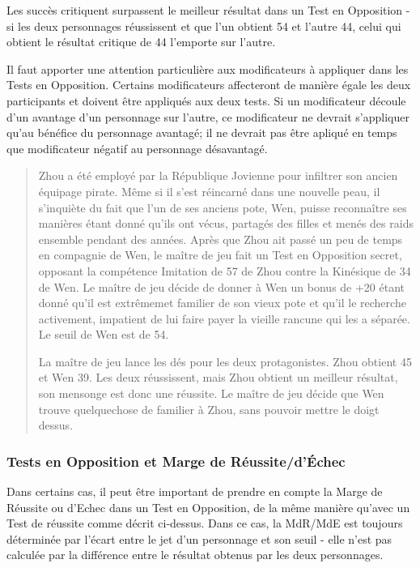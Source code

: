 Les succès critiquent surpassent le meilleur résultat dans un Test en Opposition - si les deux personnages réussissent et que l'un obtient 54 et l'autre 44, celui qui obtient le résultat critique de 44 l'emporte sur l'autre. 

Il faut apporter une attention particulière aux modificateurs à appliquer dans les Tests en Opposition. Certains modificateurs affecteront de manière égale les deux participants et doivent être appliqués aux deux tests. Si un modificateur découle d'un avantage d'un personnage sur l'autre, ce modificateur ne devrait s'appliquer qu'au bénéfice du personnage avantagé; il ne devrait pas être apliqué en temps que modificateur négatif au personnage désavantagé. 

\begin{quotation} Zhou a été employé par la République Jovienne pour infiltrer son ancien équipage pirate. Même si il s'est réincarné dans une nouvelle peau, il s'inquiète du fait que l'un de ses anciens pote, Wen, puisse reconnaître ses manières étant donné qu'ils ont vécus, partagés des filles et menés des raids ensemble pendant des années. Après que Zhou ait passé un peu de temps en compagnie de Wen, le maître de jeu fait un Test en Opposition secret, opposant la compétence Imitation de 57 de Zhou contre la Kinésique de 34 de Wen. Le maître de jeu décide de donner à Wen un bonus de +20 étant donné qu'il est extrêmemet familier de son vieux pote et qu'il le recherche activement, impatient de lui faire payer la vieille rancune qui les a séparée. Le seuil de Wen est de 54. 

La maître de jeu lance les dés pour les deux protagonistes. Zhou obtient 45 et Wen 39. Les deux réussissent, mais Zhou obtient un meilleur résultat, son mensonge est donc une réussite. Le maître de jeu décide que Wen trouve quelquechose de familier à Zhou, sans pouvoir mettre le doigt dessus. \end{quotation} 

\subsubsection{Tests en Opposition et Marge de Réussite/d'Échec} \label{sec:opposed-tests-margin} 

Dans certains cas, il peut être important de prendre en compte la Marge de Réussite ou d'Echec dans un Test en Opposition, de la même manière qu'avec un Test de réussite comme décrit ci-dessus. Dans ce cas, la MdR/MdE est toujours déterminée par l'écart entre le jet d'un personnage et son seuil - elle n'est pas calculée par la différence entre le résultat obtenus par les deux personnages. 

